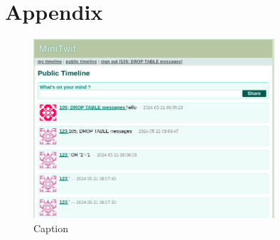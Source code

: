 \documentclass[11pt]{article}
\begin{document}
 


\newpage




\section{Appendix}
\begin{figure}
    \centering
    \includegraphics[width=0.8\textwidth]{report/images/sql_injections.png}
    \caption{Caption}
    \label{fig:sqlinjections}
\end{figure}
\end{document}
